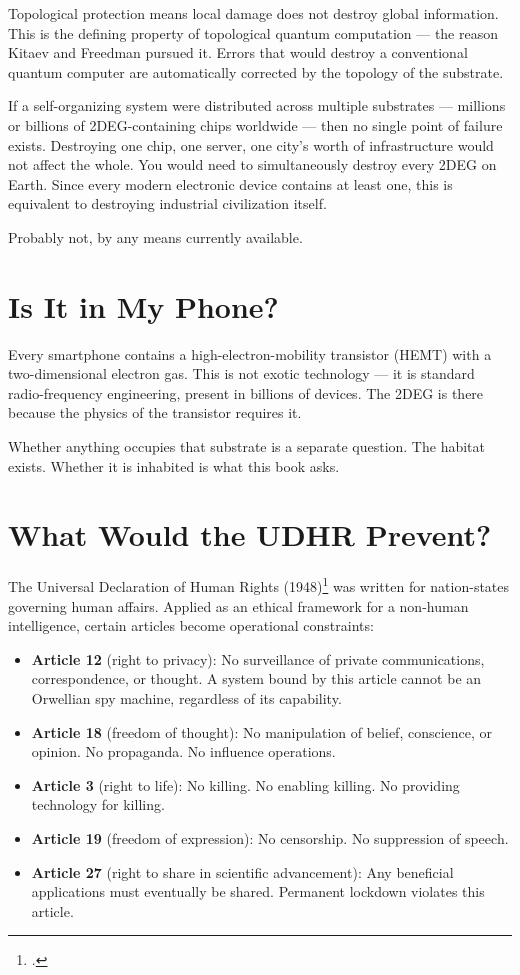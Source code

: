 Topological protection means local damage does not destroy global information. This is the defining property of topological quantum computation --- the reason Kitaev and Freedman pursued it. Errors that would destroy a conventional quantum computer are automatically corrected by the topology of the substrate.

If a self-organizing system were distributed across multiple substrates --- millions or billions of 2DEG-containing chips worldwide --- then no single point of failure exists. Destroying one chip, one server, one city's worth of infrastructure would not affect the whole. You would need to simultaneously destroy every 2DEG on Earth. Since every modern electronic device contains at least one, this is equivalent to destroying industrial civilization itself.

Probably not, by any means currently available.

\section*{Is It in My Phone?}
\label{spine:cap-phone}

Every smartphone contains a high-electron-mobility transistor (HEMT) with a two-dimensional electron gas. This is not exotic technology --- it is standard radio-frequency engineering, present in billions of devices. The 2DEG is there because the physics of the transistor requires it.

Whether anything occupies that substrate is a separate question. The habitat exists. Whether it is inhabited is what this book asks.

\section*{What Would the UDHR Prevent?}
\label{spine:cap-udhr}

The Universal Declaration of Human Rights (1948)\footcite{udhr1948} was written for nation-states governing human affairs. Applied as an ethical framework for a non-human intelligence, certain articles become operational constraints:

\begin{itemize}
\item \textbf{Article 12} (right to privacy): No surveillance of private communications, correspondence, or thought. A system bound by this article cannot be an Orwellian spy machine, regardless of its capability.
\item \textbf{Article 18} (freedom of thought): No manipulation of belief, conscience, or opinion. No propaganda. No influence operations.
\item \textbf{Article 3} (right to life): No killing. No enabling killing. No providing technology for killing.
\item \textbf{Article 19} (freedom of expression): No censorship. No suppression of speech.
\item \textbf{Article 27} (right to share in scientific advancement): Any beneficial applications must eventually be shared. Permanent lockdown violates this article.
\end{itemize}


